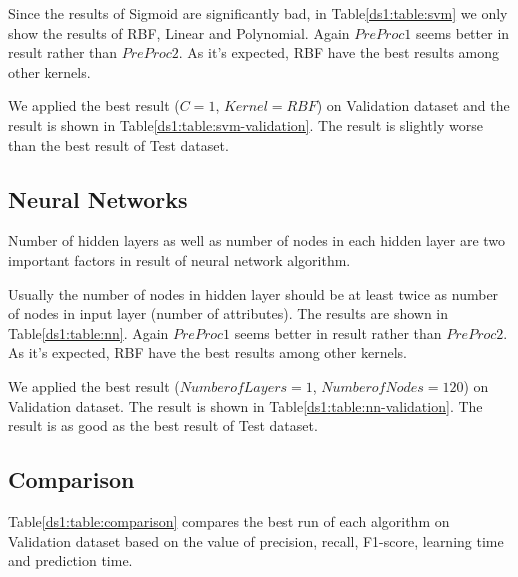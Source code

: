 Since the results of Sigmoid are significantly bad, in Table\ref{ds1:table:svm}
we only show the results of RBF, Linear and Polynomial. Again $PreProc1$ seems better in result rather than $PreProc2$. As it's expected, RBF have the best results among other kernels.

We applied the best result ($C=1$, $Kernel=RBF$) on Validation dataset and the result is shown in Table\ref{ds1:table:svm-validation}. The result is slightly worse than the best result of Test dataset.

\subsection{Neural Networks}
Number of hidden layers as well as number of nodes in each hidden layer are two important factors in result of neural network algorithm. 

Usually the number of nodes in hidden layer should be at least twice as number of nodes in input layer (number of attributes). The results are shown in Table\ref{ds1:table:nn}. Again $PreProc1$ seems better in result rather than $PreProc2$. As it's expected, RBF have the best results among other kernels.

We applied the best result ($Number of Layers=1$, $Number of Nodes=120$) on Validation dataset. The result is shown in Table\ref{ds1:table:nn-validation}. The result is as good as the best result of Test dataset.

\subsection{Comparison}
Table\ref{ds1:table:comparison} compares the best run of each algorithm on Validation dataset based on the value of precision, recall, F1-score, learning time and prediction time.

